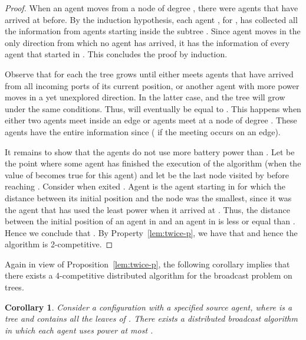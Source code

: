 \documentclass{article}
\newtheorem{corollary}{Corollary}
\begin{document}
\begin{proof}
  When an agent  moves from a node  of degree , there were  agents  that have arrived at  before. By the induction hypothesis, each agent , for , has collected all the information from agents starting inside the subtree . Since agent  moves in the only direction from which no agent has arrived, it has the information of every agent that started in . This concludes the proof by induction.

Observe that for each   the tree  grows until either  meets agents that have arrived from all incoming ports of its current position, or another agent  with more power moves in a yet unexplored direction. In the latter case,  and the tree  will grow under the same conditions. Thus,  will eventually be equal to . This happens when either two agents  meet inside an edge or  agents  meet at a node of degree . These agents have the entire information since   ( if the meeting occurs on an edge). 

It remains to show that the agents do not use more battery power than . 
Let  be the point where some agent  has finished the execution of the algorithm (when the value of  becomes true for this agent) and let  be the last node visited by  before reaching . Consider  when  exited . Agent  is the agent starting in  for which the distance between its initial position and the node  was the smallest, since it was the agent that has used the least power when it arrived at .  Thus, the distance between the initial position of an agent in  and an agent in  is less or equal than . Hence we conclude that . By Property~\ref{lem:twice-p}, we have that  and hence the algorithm is 2-competitive.
\end{proof}

Again in view of Proposition~\ref{lem:twice-p}, the following corollary implies that there exists 	a 4-competitive distributed algorithm for the broadcast problem on trees.

\begin{corollary}\label{cor:FourComp}
Consider a configuration  with a specified source agent, where  is a tree and  contains all the leaves of . There exists a distributed broadcast algorithm in which each agent uses power at most .
\end{corollary}
\end{document}
